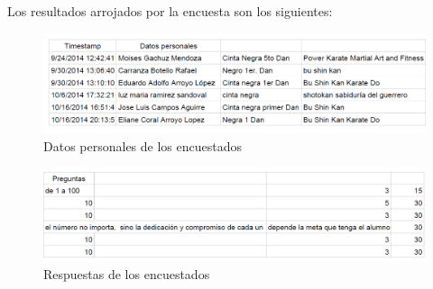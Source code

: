 Los resultados arrojados por la encuesta son los siguientes:

\begin{figure}[H]
	\begin{center}
		\includegraphics[scale=0.6]{./Figuras/Encuesta/DatosPersonales}
	\end{center}
	\caption{Datos personales de los encuestados}
	\label{fig:DatosPersonales}
\end{figure}

\begin{figure}[H]
	\begin{center}
		\includegraphics[scale=0.6]{./Figuras/Encuesta/Respuestas}
	\end{center}
	\caption{Respuestas de los encuestados}
	\label{fig:Respuestas}
\end{figure}
